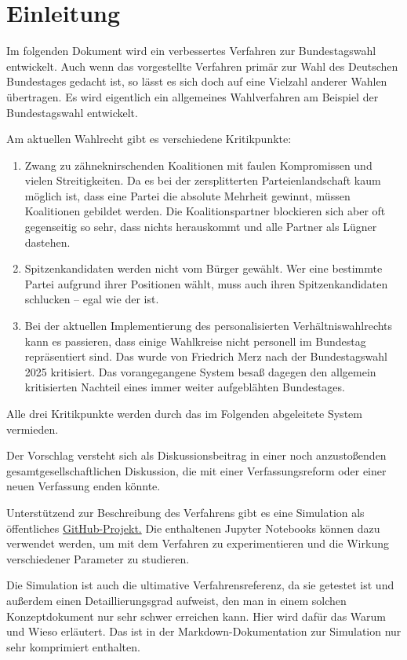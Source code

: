 \section{Einleitung}

Im folgenden Dokument wird ein verbessertes Verfahren zur Bundestagswahl entwickelt. Auch wenn
das vorgestellte Verfahren primär zur Wahl des Deutschen Bundestages gedacht ist, so lässt es
sich doch auf eine Vielzahl anderer Wahlen übertragen. Es wird eigentlich ein allgemeines
Wahlverfahren am Beispiel der Bundestagswahl entwickelt.

Am aktuellen Wahlrecht gibt es verschiedene Kritikpunkte:
\begin{enumerate}
  \item Zwang zu zähneknirschenden Koalitionen mit faulen Kompromissen und vielen Streitigkeiten.
    Da es bei der zersplitterten Parteienlandschaft kaum möglich ist, dass eine Partei die absolute
    Mehrheit gewinnt, müssen Koalitionen gebildet werden. Die Koalitionspartner blockieren sich
    aber oft gegenseitig so sehr, dass nichts herauskommt und alle Partner als Lügner dastehen.

  \item Spitzenkandidaten werden nicht vom Bürger gewählt. Wer eine bestimmte Partei aufgrund
    ihrer Positionen wählt, muss auch ihren Spitzenkandidaten schlucken -- egal wie der ist.

  \item Bei der aktuellen Implementierung des personalisierten Verhältniswahlrechts kann es
    passieren, dass einige Wahlkreise nicht personell im Bundestag repräsentiert sind. Das wurde
    von Friedrich Merz nach der Bundestagswahl 2025 kritisiert. Das vorangegangene System besaß
    dagegen den allgemein kritisierten Nachteil eines immer weiter aufgeblähten Bundestages.
\end{enumerate}

Alle drei Kritikpunkte werden durch das im Folgenden abgeleitete System vermieden.

Der Vorschlag versteht sich als Diskussionsbeitrag in einer noch anzustoßenden
gesamtgesellschaftlichen Diskussion, die mit einer Verfassungsreform oder einer neuen Verfassung
enden könnte.

Unterstützend zur Beschreibung des Verfahrens gibt es eine Simulation als öffentliches
\href{https://github.com/danielschwalbe/ipres}{GitHub-Projekt.} Die enthaltenen Jupyter Notebooks
können dazu verwendet werden, um mit dem Verfahren zu experimentieren und die Wirkung
verschiedener Parameter zu studieren.

Die Simulation ist auch die ultimative Verfahrensreferenz, da sie getestet ist und außerdem
einen Detaillierungsgrad aufweist, den man in einem solchen Konzeptdokument nur sehr schwer
erreichen kann. Hier wird dafür das Warum und Wieso erläutert. Das ist in der Markdown-Dokumentation
zur Simulation nur sehr komprimiert enthalten.
